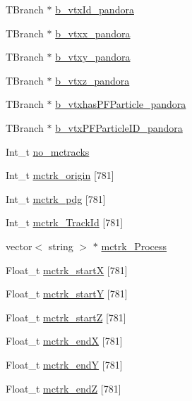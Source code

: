 \begin{DoxyCompactItemize}
\item 
T\-Branch $\ast$ \hyperlink{classanatree_a6b0671aa6e7d8a9136795e2e82b32152}{b\-\_\-vtx\-Id\-\_\-pandora}
\item 
T\-Branch $\ast$ \hyperlink{classanatree_a5d2c77ffb866e3bb8601ecb39770d529}{b\-\_\-vtxx\-\_\-pandora}
\item 
T\-Branch $\ast$ \hyperlink{classanatree_a1407580f2a3f0f6a87d9cc3c5c5521dd}{b\-\_\-vtxy\-\_\-pandora}
\item 
T\-Branch $\ast$ \hyperlink{classanatree_a599d23166be5a996121b5d1f35ef1f56}{b\-\_\-vtxz\-\_\-pandora}
\item 
T\-Branch $\ast$ \hyperlink{classanatree_a576282c18c6c07b641f46c2d35887715}{b\-\_\-vtxhas\-P\-F\-Particle\-\_\-pandora}
\item 
T\-Branch $\ast$ \hyperlink{classanatree_a2113a2c4a5e200f30e6f13b8eff8324d}{b\-\_\-vtx\-P\-F\-Particle\-I\-D\-\_\-pandora}
\item 
Int\-\_\-t \hyperlink{classanatree_aabdf13b17aaeb4aae05a427dd601955a}{no\-\_\-mctracks}
\item 
Int\-\_\-t \hyperlink{classanatree_acae3f36be2999afb0940a9cab9847dcc}{mctrk\-\_\-origin} \mbox{[}781\mbox{]}
\item 
Int\-\_\-t \hyperlink{classanatree_a4b45b29a37b7ecbebab9de9c6e738881}{mctrk\-\_\-pdg} \mbox{[}781\mbox{]}
\item 
Int\-\_\-t \hyperlink{classanatree_a8420b20e93ee1d4be6090eae17ec2ad0}{mctrk\-\_\-\-Track\-Id} \mbox{[}781\mbox{]}
\item 
vector$<$ string $>$ $\ast$ \hyperlink{classanatree_a206fa2c6aabed167deb2a695feb437b2}{mctrk\-\_\-\-Process}
\item 
Float\-\_\-t \hyperlink{classanatree_ac580667ac304cae59b47b313fb17f242}{mctrk\-\_\-start\-X} \mbox{[}781\mbox{]}
\item 
Float\-\_\-t \hyperlink{classanatree_ad0c7a5b476381e6e017e82392ed06f7e}{mctrk\-\_\-start\-Y} \mbox{[}781\mbox{]}
\item 
Float\-\_\-t \hyperlink{classanatree_a16081a2b4c910260b1ce8374cb9a5f1c}{mctrk\-\_\-start\-Z} \mbox{[}781\mbox{]}
\item 
Float\-\_\-t \hyperlink{classanatree_a56991dea723aa6abbdbb91934c60c9b7}{mctrk\-\_\-end\-X} \mbox{[}781\mbox{]}
\item 
Float\-\_\-t \hyperlink{classanatree_abefe0687882e47120f8c075d606e783a}{mctrk\-\_\-end\-Y} \mbox{[}781\mbox{]}
\item 
Float\-\_\-t \hyperlink{classanatree_aa09b922fc0757b0d77de4a476e2f7b18}{mctrk\-\_\-end\-Z} \mbox{[}781\mbox{]}

\end{DoxyCompactItemize}
